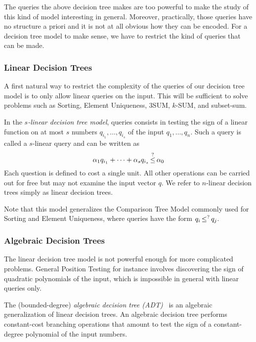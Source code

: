 The queries the above decision tree makes are too powerful to make the study of
this kind of model interesting in general.
%
Moreover, practically, those queries have no structure a priori and it is not at
all obvious how they can be encoded.
%
For a decision tree model to make sense, we have to restrict the kind of
queries that can be made.

\subsubsection{Linear Decision Trees}

A first natural way to restrict the complexity of the queries of our decision
tree model is to only allow linear queries on the input. This will be
sufficient to solve problems such as Sorting, Element Uniqueness, 3SUM,
\(k\)-SUM, and subset-sum.

In the \emph{\(s\)-linear decision tree model}, queries consists
in testing the sign of a linear function on at most \(s\) numbers \(q_{i_1},\ldots,q_{i_s}\) of the
input \(q_1,\ldots,q_n\). Such a query is called a \(s\)-linear query and
can be written as
%
\begin{displaymath}
	\alpha_1 q_{i_1} + \cdots + \alpha_s q_{i_s} \mathop{\leq}^{?} \alpha_0
\end{displaymath}
%
Each question is defined to cost a single unit. All other operations can be
carried out for free but may not examine the input vector $q$. We refer to
$n$-linear decision trees simply as linear decision trees.

Note that this model generalizes the Comparison Tree Model commonly used for
Sorting and Element Uniqueness, where queries have the form \(q_i \mathop{\leq}^{?}
q_j\).

\subsubsection{Algebraic Decision Trees}
The linear decision tree model is not powerful enough for more complicated
problems. General Position Testing for instance involves discovering the sign
of quadratic polynomials of the input, which is impossible in general with
linear queries only.

The (bounded-degree) \emph{algebraic decision tree (ADT)}~\cite{R72,Y81,SY82}
is an algebraic generalization of linear decision trees.
An algebraic decision tree performs constant-cost branching operations that
amount to test the sign of
a constant-degree polynomial of the input numbers.

